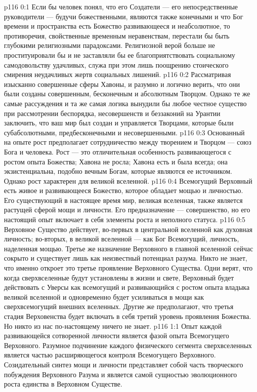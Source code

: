 \author{Могучий Вестник}
\vs p116 0:1 Если бы человек понял, что его Создатели --- его непосредственные руководители --- будучи божественными, являются также конечными и что Бог времени и пространства есть Божество развивающееся и неабсолютное, то противоречия, свойственные временным неравенствам, перестали бы быть глубокими религиозными парадоксами. Религиозной верой больше не проституировали бы и не заставляли бы ее благоприятствовать социальному самодовольству удачливых, служа при этом лишь поощрению стоического смирения неудачливых жертв социальных лишений.
\vs p116 0:2 Рассматривая изысканно совершенные сферы Хавоны, и разумно и логично верить, что они были созданы совершенным, бесконечным и абсолютным Творцом. Однако те же самые рассуждения и та же самая логика вынудили бы любое честное существо при рассмотрении беспорядка, несовершенств и беззаконий на Урантии заключить, что ваш мир был создан и управляется Творцами, которые были субабсолютными, предбесконечными и несовершенными.
\vs p116 0:3 \pc Основанный на опыте рост предполагает сотрудничество между творением и Творцом --- союз Бога и человека. Рост --- это отличительная особенность развивающегося с ростом опыта Божества; Хавона не росла; Хавона есть и была всегда; она экзистенциальна, подобно вечным Богам, которые являются ее источником. Однако рост характерен для великой вселенной.
\vs p116 0:4 Всемогущий Верховный есть живое и развивающееся Божество, которое обладает мощью и личностью. Его существующий в настоящее время мир, великая вселенная, также является растущей сферой мощи и личности. Его предназначение --- совершенство, но его настоящий опыт включает в себя элементы роста и неполного статуса.
\vs p116 0:5 \pc Верховное Существо действует, во\hyp{}первых в центральной вселенной как духовная личность; во\hyp{}вторых, в великой вселенной --- как Бог Всемогущий, личность, наделенная мощью. Третье же назначение Верховного в главной вселенной сейчас сокрыто и существует лишь как неизвестный потенциал разума. Никто не знает, что именно откроет это третье проявление Верховного Существа. Одни верят, что когда сверхвселенные будут установлены в жизни и свете, Верховный будет действовать с Уверсы как всемогущий и развивающийся с ростом опыта владыка великой вселенной и одновременно будет усиливаться в мощи как сверхвсемогущий внешних вселенных. Другие же предполагают, что третья стадия Верховенства будет включать в себя третий уровень проявления Божества. Но никто из нас по\hyp{}настоящему ничего не знает.
\vs p116 1:1 Опыт каждой развивающейся сотворенной личности является фазой опыта Всемогущего Верховного. Разумное подчинение каждого физического сегмента сверхвселенных является частью расширяющегося контроля Всемогущего Верховного. Созидательный синтез мощи и личности представляет собой часть творческого побуждения Верховного Разума и является самой сущностью эволюционного роста единства в Верховном Существе.
